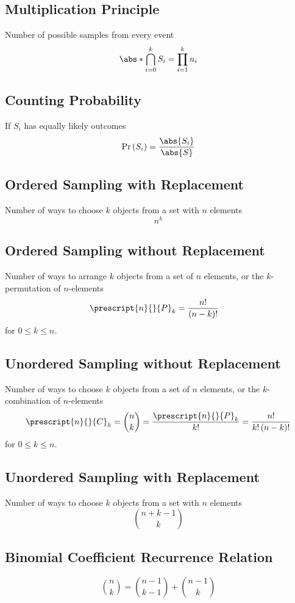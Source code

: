 \documentclass{article}
\begin{document}
\begin{multicols}{3}
    \subsection{Multiplication Principle}
    Number of possible samples from every event
    \begin{equation*}
        \abs*{\bigcap_{i=0}^{k} S_i} = \prod_{i = 1}^k n_i
    \end{equation*}
    \subsection{Counting Probability}
    If \(S_i\) has equally likely outcomes
    \begin{equation*}
        \Pr{\left( S_i \right)} = \frac{\abs{S_i}}{\abs{S}}
    \end{equation*}
    \subsection{Ordered Sampling with Replacement}
    Number of ways to choose \(k\) objects from a set with \(n\) elements
    \begin{equation*}
        n^k
    \end{equation*}
    \subsection{Ordered Sampling without Replacement}
    Number of ways to arrange \(k\) objects from a set of \(n\) elements,
    or the \(k\)-permutation of \(n\)-elements
    \begin{align*}
        \prescript{n}{}{P}_k & = \frac{n!}{\left( n - k \right)!}
    \end{align*}
    for \(0 \leq k \leq n\).
    \subsection{Unordered Sampling without Replacement}
    Number of ways to choose \(k\) objects from a set of \(n\) elements,
    or the \(k\)-combination of \(n\)-elements
    \begin{align*}
        \prescript{n}{}{C}_k = \binom{n}{k} = \frac{\prescript{n}{}{P}_k}{k!} = \frac{n!}{k! \left( n - k \right)!}
    \end{align*}
    for \(0 \leq k \leq n\).
    \subsection{Unordered Sampling with Replacement}
    Number of ways to choose \(k\) objects from a set with \(n\) elements
    \begin{equation*}
        \binom{n + k - 1}{k}
    \end{equation*}
    \subsection{Binomial Coefficient Recurrence Relation}
    \begin{equation*}
        \binom{n}{k} = \binom{n - 1}{k - 1} + \binom{n - 1}{k}
    \end{equation*}
\end{multicols}
\end{document}
